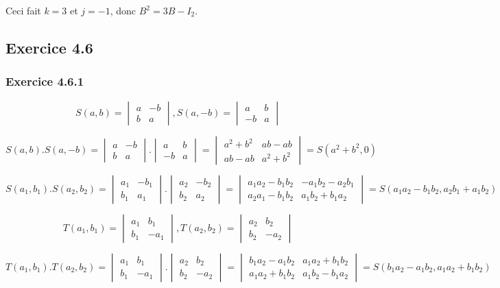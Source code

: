\documentclass[]{book}
\theoremstyle{definition}
\begin{document}
Ceci fait $k=3$ et $j=-1$, donc $B^2 = 3B - I_2$.\\

\subsection*{Exercice 4.6}
\subsubsection*{Exercice 4.6.1}
$$S(a,b) = \begin{vmatrix} a & -b \\ b & a \end{vmatrix},
S(a,-b) = \begin{vmatrix} a & b \\ -b & a \end{vmatrix}$$

$$S(a,b).S(a,-b) = \begin{vmatrix} a & -b \\ b & a \end{vmatrix}.\begin{vmatrix} a & b \\ -b & a \end{vmatrix} = 
\begin{vmatrix} a^2+b^2 & ab-ab \\ ab-ab & a^2+b^2 \end{vmatrix} = S(a^2+b^2,0)$$

$$
S(a_1,b_1).S(a_2,b_2) = 
\begin{vmatrix} a_1 & -b_1 \\ b_1 & a_1 \end{vmatrix}.\begin{vmatrix} a_2 & -b_2 \\ b_2 & a_2 \end{vmatrix} = 
\begin{vmatrix} a_1a_2-b_1b_2 & -a_1b_2-a_2b_1 \\ a_2a_1-b_1b_2 & a_1b_2+b_1a_2 \end{vmatrix} = S(a_1a_2-b_1b_2,a_2b_1+a_1b_2)
$$

$$
T(a_1,b_1) = \begin{vmatrix} a_1 & b_1 \\ b_1 & -a_1 \end{vmatrix}, 
T(a_2,b_2) = \begin{vmatrix} a_2 & b_2 \\ b_2 & -a_2 \end{vmatrix}
$$

$$
T(a_1,b_1).T(a_2,b_2) = 
\begin{vmatrix} a_1 & b_1 \\ b_1 & -a_1 \end{vmatrix}.\begin{vmatrix} a_2 & b_2 \\ b_2 & -a_2 \end{vmatrix} = 
\begin{vmatrix} b_1a_2-a_1b_2 & a_1a_2+b_1b_2 \\ a_1a_2+b_1b_2 & a_1b_2-b_1a_2 \end{vmatrix} = 
S(b_1a_2-a_1b_2,a_1a_2+b_1b_2)
$$
\end{document}
